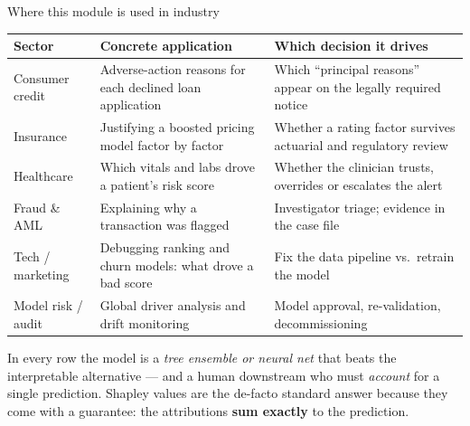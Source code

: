 \documentclass[aspectratio=169,11pt]{beamer}
\begin{document}
\begin{frame}{Where this module is used in industry}
  \scriptsize
  \begin{center}
  \begin{tabular}{@{}p{2.6cm}p{5.2cm}p{4.6cm}@{}}
    \toprule
    \textbf{Sector} & \textbf{Concrete application} & \textbf{Which decision it drives} \\
    \midrule
    Consumer credit & Adverse-action reasons for each declined loan
      application & Which ``principal reasons'' appear on the legally required notice \\
    Insurance & Justifying a boosted pricing model factor by factor &
      Whether a rating factor survives actuarial and regulatory review \\
    Healthcare & Which vitals and labs drove a patient's risk score &
      Whether the clinician trusts, overrides or escalates the alert \\
    Fraud \& AML & Explaining why a transaction was flagged &
      Investigator triage; evidence in the case file \\
    Tech / marketing & Debugging ranking and churn models: what drove a
      bad score & Fix the data pipeline vs.\ retrain the model \\
    Model risk / audit & Global driver analysis and drift monitoring &
      Model approval, re-validation, decommissioning \\
    \bottomrule
  \end{tabular}
  \end{center}
  \begin{industry}
    In every row the model is a \emph{tree ensemble or neural net} that beats the
    interpretable alternative --- and a human downstream who must \emph{account} for a
    single prediction. Shapley values are the de-facto standard answer because they
    come with a guarantee: the attributions \textbf{sum exactly} to the prediction.
  \end{industry}
\end{frame}
\end{document}

